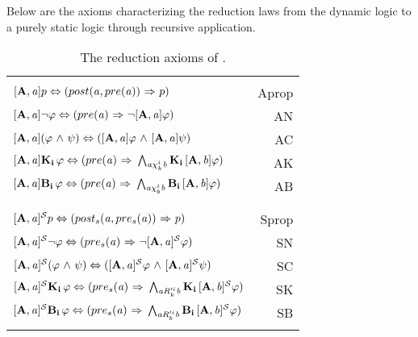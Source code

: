
Below are the axioms characterizing the reduction laws from the dynamic logic to a purely static logic through recursive application.\\
\begin{table}[H]
	\begin{center}
    \begin{tabular}{| l r |}
    \hline & \\
	$\mathbf{[A,\mathit{a}]}p \Leftrightarrow (post(\mathit{a},pre(\mathit{a})) {\ \Rightarrow \ } p)$ & Aprop \\
	$\mathbf{[A,\mathit{a}]}{\neg}\varphi \Leftrightarrow (pre(\mathit{a}) {\ \Rightarrow \ } {\neg} \mathbf{[A,\mathit{a}]}\varphi)$ & AN\\
	$\mathbf{[A,\mathit{a}]}(\varphi {\ \wedge \ } \psi) \Leftrightarrow (\mathbf{[A,\mathit{a}]}\varphi {\ \wedge \ } \mathbf{[A,\mathit{a}]}\psi)$ & AC\\
	$\mathbf{[A,\mathit{a}]}\mathbf{K}_{\mathbf{i}}\,\varphi \Leftrightarrow (pre(\mathit{a}) {\ \Rightarrow \ } \bigwedge_{\mathit{a}\chi_{k}^i \mathit{b}}\mathbf{K}_{\mathbf{i}}\,\mathbf{[A,\mathit{b}]}\varphi)$ & AK\\
	$\mathbf{[A,\mathit{a}]}\mathbf{B}_{\mathbf{i}}\,\varphi \Leftrightarrow (pre(\mathit{a}) {\ \Rightarrow \ } \bigwedge_{\mathit{a}\chi_{b}^i \mathit{b}}\mathbf{B}_{\mathbf{i}}\,\mathbf{[A,\mathit{b}]}\varphi)$ & AB\\ & \\
	\hline & \\
	$\mathbf{[A,\mathit{a}]^\mathcal{S}}p \Leftrightarrow (post_s(\mathit{a},pre_s(\mathit{a})) {\ \Rightarrow \ } p)$ & Sprop\\
	$\mathbf{[A,\mathit{a}]^\mathcal{S}}{\neg}\varphi \Leftrightarrow (pre_s(\mathit{a}) {\ \Rightarrow \ } {\neg} \mathbf{[A,\mathit{a}]^\mathcal{S}}\varphi)$ & SN\\
	$\mathbf{[A,\mathit{a}]^\mathcal{S}}(\varphi {\ \wedge \ } \psi) \Leftrightarrow (\mathbf{[A,\mathit{a}]^\mathcal{S}}\varphi {\ \wedge \ } \mathbf{[A,\mathit{a}]^\mathcal{S}}\psi)$ & SC\\
	$\mathbf{[A,\mathit{a}]^\mathcal{S}}\mathbf{K}_{\mathbf{i}}\,\varphi \Leftrightarrow (pre_s(\mathit{a}) {\ \Rightarrow \ } \bigwedge_{\mathit{a}R_{k}'^{i}\mathit{b}}\mathbf{K}_{\mathbf{i}}\,\mathbf{[A,\mathit{b}]^\mathcal{S}}\varphi)$ & SK\\
	$\mathbf{[A,\mathit{a}]^\mathcal{S}}\mathbf{B}_{\mathbf{i}}\,\varphi \Leftrightarrow (pre_s(\mathit{a}) {\ \Rightarrow \ } \bigwedge_{\mathit{a}R_{b}'^{i}\mathit{b}}\mathbf{B}_{\mathbf{i}}\,\mathbf{[A,\mathit{b}]^\mathcal{S}}\varphi)$ & SB\\ & \\
	\hline
	\end{tabular}
	\caption{The reduction axioms of \DASL.}
	\end{center}
\end{table}

